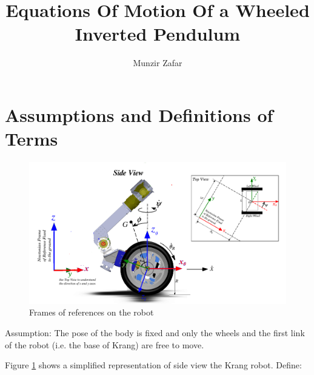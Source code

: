 \documentclass[a4paper,10pt]{article}
\title{Equations Of Motion Of a Wheeled Inverted Pendulum}
\author{Munzir Zafar}
\begin{document}
\maketitle

\section{Assumptions and Definitions of Terms}

\begin{figure}
 \centering
 \includegraphics[width=\textwidth]{Figures/referenceImage.png}
 \caption{Frames of references on the robot}
 \label{fig:frames}
\end{figure}

Assumption: The pose of the body is fixed and only the wheels and the first link of the robot (i.e. the
base of Krang) are free to move.

Figure \ref{fig:frames} shows a simplified representation of side view the Krang robot. Define:
\end{document}
